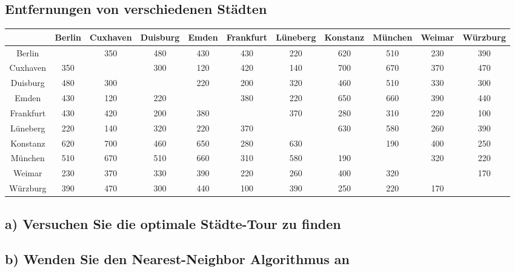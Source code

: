\documentclass{article}
\begin{document}
\begin{landscape}
\section*{Entfernungen von verschiedenen Städten}

\begin{tabular}{ |c|c|c|c|c|c|c|c|c|c|c| }
\hline
 & Berlin & Cuxhaven & Duisburg & Emden & Frankfurt & Lüneberg & Konstanz & München & Weimar & Würzburg \\
\hline
\rowcolor{gray!30}
Berlin &  & 350 & 480 & 430 & 430 & 220 & 620 & 510 & 230 & 390 \\
\hline
Cuxhaven & 350 &  & 300 & 120 & 420 & 140 & 700 & 670 & 370 & 470 \\
\hline
\rowcolor{gray!30}
Duisburg & 480 & 300 &  & 220 & 200 & 320 & 460 & 510 & 330 & 300 \\
\hline
Emden & 430 & 120 & 220 &  & 380 & 220 & 650 & 660 & 390 & 440 \\
\hline
\rowcolor{gray!30}
Frankfurt & 430 & 420 & 200 & 380 &  & 370 & 280 & 310 & 220 & 100 \\
\hline
Lüneberg & 220 & 140 & 320 & 220 & 370 &  & 630 & 580 & 260 & 390 \\
\hline
\rowcolor{gray!30}
Konstanz & 620 & 700 & 460 & 650 & 280 & 630 &  & 190 & 400 & 250 \\
\hline
München & 510 & 670 & 510 & 660 & 310 & 580 & 190 &  & 320 & 220 \\
\hline
\rowcolor{gray!30}
Weimar & 230 & 370 & 330 & 390 & 220 & 260 & 400 & 320 &  & 170 \\
\hline
Würzburg & 390 & 470 & 300 & 440 & 100 & 390 & 250 & 220 & 170 & \\
\hline
\end{tabular}
	
\subsection*{a) Versuchen Sie die optimale Städte-Tour zu finden}	

\subsection*{b) Wenden Sie den Nearest-Neighbor Algorithmus an}	
	
\end{landscape}
	
\end{document}
